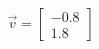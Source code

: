 \documentclass[preview]{standalone}
\begin{document}
\begin{align*}
\vec{v}=\begin{bmatrix}-0.8\\1.8\end{bmatrix}
\end{align*}
\end{document}
